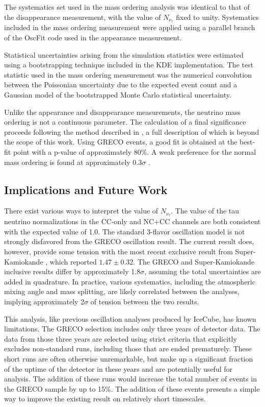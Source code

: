 The systematics set used in the mass ordering analysis was identical to that of the disappearance measurement, with the value of ${N_{\nu_\tau}}$ fixed to unity.
Systematics included in the mass ordering measurement were applied using a parallel branch of the OscFit code used in the appearance measurement.

Statistical uncertainties arising from the simulation statistics were estimated using a bootstrapping technique included in the KDE implementation.
The test statistic used in the mass ordering measurement was the numerical convolution between the Poissonian uncertainty due to the expected event count and a Gaussian model of the bootstrapped Monte Carlo statistical uncertainty.

Unlike the appearance and disappearance measurements, the neutrino mass ordering is not a continuous parameter. 
The calculation of a final significance proceeds following the method described in \cite{Thesis-Ste}, a full description of which is beyond the scope of this work.
Using GRECO events, a good fit is obtained at the best-fit point with a p-value of approximately 80\%.
A weak preference for the normal mass ordering is found at approximately 0.3${\sigma}$ \cite{Thesis-Martin}.

\label{subsec:implications}
\subsection{Implications and Future Work}
There exist various ways to interpret the value of $N_{\nu_\tau}$. 
The value of the tau neutrino normalizations in the CC-only and NC+CC channels are both consistent with the expected value of 1.0.
The standard 3-flavor oscillation model is not strongly disfavored from the GRECO oscillation result.
The current result does, however, provide some tension with the most recent exclusive result from Super-Kamiokande \cite{SuperK-Tau2017,}, which reported ${1.47\pm0.32}$. 
The GRECO and Super-Kamiokande inclusive results differ by approximately 1.8${\sigma}$, assuming the total uncertainties are added in quadrature.
In practice, various systematics, including the atmospheric mixing angle and mass splitting, are likely correlated between the analyses, implying approximately 2${\sigma}$ of tension between the two results.

This analysis, like previous oscillation analyses produced by IceCube, has known limitations.
The GRECO selection includes only three years of detector data.
The data from those three years are selected using strict criteria that explicitly excludes non-standard runs, including those that are ended prematurely.
These short runs are often otherwise unremarkable, but make up a significant fraction of the uptime of the detector in these years and are potentially useful for analysis.
The addition of these runs would increase the total number of events in the GRECO sample by up to 15\%.
The addition of these events presents a simple way to improve the existing result on relatively short timescales.

